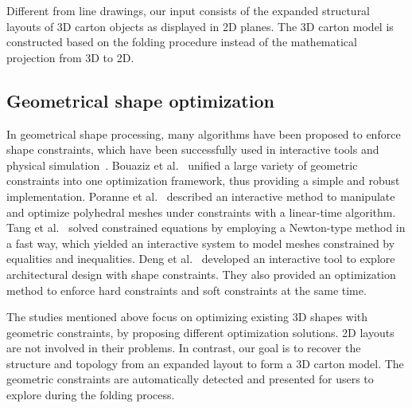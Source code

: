 Different from line drawings, our input consists of the expanded structural layouts of 3D carton objects as displayed in 2D planes.
%
The 3D carton model is constructed based on the folding procedure instead of the mathematical projection from 3D to 2D.

\subsection{Geometrical shape optimization}
In geometrical shape processing, many algorithms have been proposed to enforce shape constraints, which have been successfully used in interactive tools and physical simulation~\cite{Botsch:2006:PCP:1281957.1281959,Igarashi:2005:ASM:1186822.1073323}. 
Bouaziz et al.~\cite{Bouaziz:2012:SSD:2346796.2346802} unified a large variety of geometric constraints into one optimization framework, thus providing a simple and robust implementation. 
Poranne et al.~\cite{Poranne2013Interactive} described an interactive method to manipulate and optimize polyhedral meshes under constraints with a linear-time algorithm. 
%
Tang et al.~\cite{Tang:2014:FPM:2601097.2601213} solved constrained equations by employing a Newton-type method in a fast way, which yielded an interactive system to model meshes constrained by equalities and inequalities. 
Deng et al.~\cite{Deng2015} developed an interactive tool to explore architectural design with shape constraints.
They also provided an optimization method to enforce hard constraints and soft constraints at the same time. 

The studies mentioned above focus on optimizing existing 3D shapes with geometric constraints, by proposing different optimization solutions.
%
2D layouts are not involved in their problems.
In contrast, our goal is to recover the structure and topology from an expanded layout to form a 3D carton model.
The geometric constraints are automatically detected and presented for users to explore during the folding process.  



